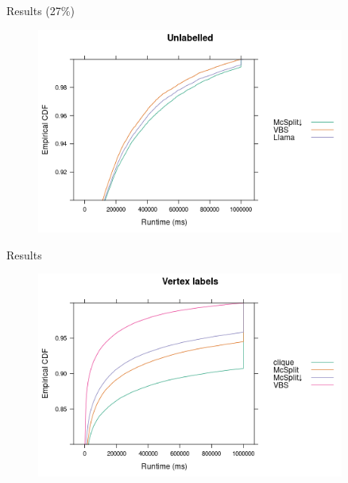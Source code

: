 \documentclass{beamer}
\begin{document}
\begin{frame}{Results (27\%)}
  \begin{figure}
    \centering
    \includegraphics[width=0.9\textwidth]{../dissertation/images/ecdf_unlabelled_llama.png}
  \end{figure}
\end{frame}

\begin{frame}{Results}
  \begin{figure}
    \centering
    \includegraphics[width=0.9\textwidth]{../dissertation/images/ecdf_vertex_labels.png}
  \end{figure}
\end{frame}
\end{document}
